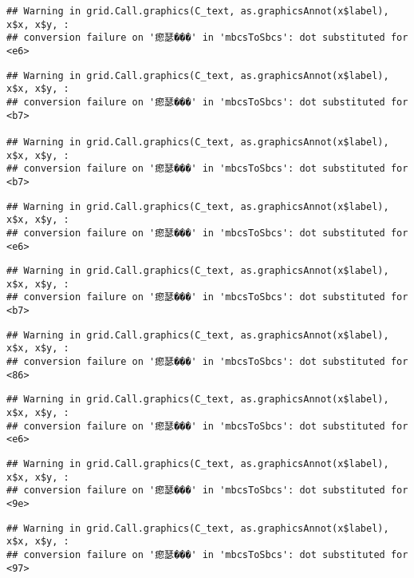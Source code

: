\documentclass[
]{article}
\begin{document}
\begin{verbatim}
## Warning in grid.Call.graphics(C_text, as.graphicsAnnot(x$label), x$x, x$y, :
## conversion failure on '瘛瑟���' in 'mbcsToSbcs': dot substituted for <e6>
\end{verbatim}

\begin{verbatim}
## Warning in grid.Call.graphics(C_text, as.graphicsAnnot(x$label), x$x, x$y, :
## conversion failure on '瘛瑟���' in 'mbcsToSbcs': dot substituted for <b7>

## Warning in grid.Call.graphics(C_text, as.graphicsAnnot(x$label), x$x, x$y, :
## conversion failure on '瘛瑟���' in 'mbcsToSbcs': dot substituted for <b7>
\end{verbatim}

\begin{verbatim}
## Warning in grid.Call.graphics(C_text, as.graphicsAnnot(x$label), x$x, x$y, :
## conversion failure on '瘛瑟���' in 'mbcsToSbcs': dot substituted for <e6>
\end{verbatim}

\begin{verbatim}
## Warning in grid.Call.graphics(C_text, as.graphicsAnnot(x$label), x$x, x$y, :
## conversion failure on '瘛瑟���' in 'mbcsToSbcs': dot substituted for <b7>
\end{verbatim}

\begin{verbatim}
## Warning in grid.Call.graphics(C_text, as.graphicsAnnot(x$label), x$x, x$y, :
## conversion failure on '瘛瑟���' in 'mbcsToSbcs': dot substituted for <86>
\end{verbatim}

\begin{verbatim}
## Warning in grid.Call.graphics(C_text, as.graphicsAnnot(x$label), x$x, x$y, :
## conversion failure on '瘛瑟���' in 'mbcsToSbcs': dot substituted for <e6>
\end{verbatim}

\begin{verbatim}
## Warning in grid.Call.graphics(C_text, as.graphicsAnnot(x$label), x$x, x$y, :
## conversion failure on '瘛瑟���' in 'mbcsToSbcs': dot substituted for <9e>
\end{verbatim}

\begin{verbatim}
## Warning in grid.Call.graphics(C_text, as.graphicsAnnot(x$label), x$x, x$y, :
## conversion failure on '瘛瑟���' in 'mbcsToSbcs': dot substituted for <97>
\end{verbatim}
\end{document}

